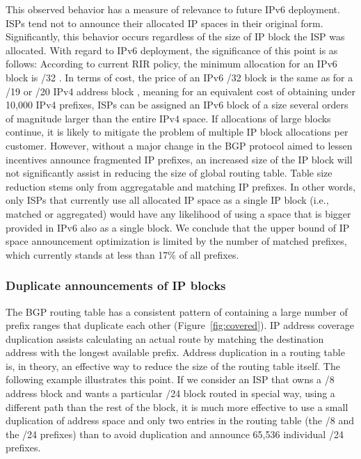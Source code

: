 This observed behavior has a measure of relevance to future IPv6 deployment.
ISPs tend not to announce their allocated IP spaces in their original form.
Significantly, this behavior occurs regardless of the size of IP block the ISP
was allocated. With regard to IPv6 deployment, the significance of this point
is as follows: According to current RIR policy, the minimum allocation for an
IPv6 block is /32 \cite{APNIC:2009:IPv6-Address}. In terms of cost, the price
of an IPv6 /32 block is the same as for a /19 or /20 IPv4 address block
\cite{ARIN:2009:Annual-Fee-Scedule}, meaning for an equivalent cost of
obtaining under 10,000 IPv4 prefixes, ISPs can be assigned an IPv6 block of a
size several orders of magnitude larger than the entire IPv4 space. If
allocations of large blocks continue, it is likely to mitigate the problem of
multiple IP block allocations per customer. However, without a major change in
the BGP protocol aimed to lessen incentives announce fragmented IP prefixes,
an increased size of the IP block will not significantly assist in reducing
the size of global routing table. Table size reduction stems only from
aggregatable and matching IP prefixes. In other words, only ISPs that
currently use all allocated IP space as a single IP block (i.e., matched or
aggregated) would have any likelihood of using a space that is bigger provided
in IPv6 also as a single block. We conclude that the upper bound of IP space
announcement optimization is limited by the number of matched prefixes, which
currently stands at less than 17\% of all prefixes.

\subsubsection{Duplicate announcements of IP blocks}

The BGP routing table has a consistent pattern of containing a large number of
prefix ranges that duplicate each other (Figure~\ref{fig:covered}). IP address
coverage duplication assists calculating an actual route by matching the
destination address with the longest available prefix.  Address duplication in
a routing table is, in theory, an effective way to reduce the size of the
routing table itself. The following example illustrates this point. If we
consider an ISP that owns a /8 address block and wants a particular /24 block
routed in special way, using a different path than the rest of the block, it is
much more effective to use a small duplication of address space and only two
entries in the routing table (the /8 and the /24 prefixes) than to avoid
duplication and announce 65,536 individual /24 prefixes.

